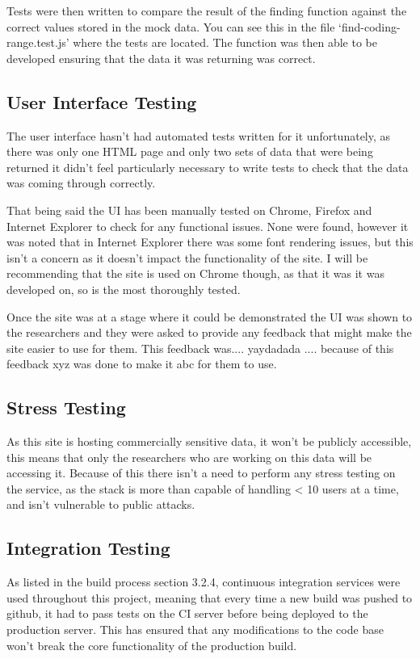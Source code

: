 {Tests were then written to compare the result of the finding function against the correct values stored in the mock data. You can see this in the file `find-coding-range.test.js' where the tests are located. The function was then able to be developed ensuring that the data it was returning was correct. 

\subsection{User Interface Testing}
The user interface hasn't had automated tests written for it unfortunately, as there was only one HTML page and only two sets of data that were being returned it didn't feel particularly necessary to write tests to check that the data was coming through correctly. 

That being said the UI has been manually tested on Chrome, Firefox and Internet Explorer to check for any functional issues. None were found, however it was noted that in Internet Explorer there was some font rendering issues, but this isn't a concern as it doesn't impact the functionality of the site. I will be recommending that the site is used on Chrome though, as that it was it was developed on, so is the most thoroughly tested. 

Once the site was at a stage where it could be demonstrated the UI was shown to the researchers and they were asked to provide any feedback that might make the site easier to use for them. This feedback was.... yaydadada .... because of this feedback xyz was done to make it abc for them to use.

\subsection{Stress Testing}
As this site is hosting commercially sensitive data, it won't be publicly accessible, this means that only the researchers who are working on this data will be accessing it. Because of this there isn't a need to perform any stress testing on the service, as the stack is more than capable of handling < 10 users at a time, and isn't vulnerable to public attacks. 

\subsection{Integration Testing}
As listed in the build process section 3.2.4, continuous integration services were used throughout this project, meaning that every time a new build was pushed to github, it had to pass tests on the CI server before being deployed to the production server. This has ensured that any modifications to the code base won't break the core functionality of the production build. 

}
